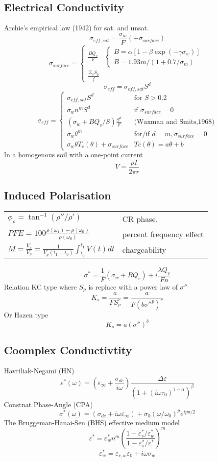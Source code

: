 \documentclass[twocolumn]{article}
\begin{document}
\subsection{Electrical Conductivity}
Archie's empirical law (1942) for sat. and unsat.
\[ \sigma_{eff,sat} = \frac{\sigma_w}{F} (+\sigma_{surface})\]
\[\sigma_{surface}= \left\{
  \begin{array}{lr}
    \frac{BQ_v}{F} & \left\{
    				\begin{array}{l}
    					B=\alpha[1-\beta \exp(-\gamma\sigma_w)]\\
    					B=1.93m/(1+0.7/\sigma_m)
    				\end{array} \right. \\ 
    \frac{\Sigma_s S_p}{f} &
  \end{array}
\right.\]
\[ \sigma_{eff}=\sigma_{eff,sat}S^d\]
\[\sigma_{eff}= \left\{
  \begin{array}{lr}
    \sigma_{eff,sat}S^d &  \text{for } S>0.2\\ 
    \sigma_{w}n^mS^d & \text{if } \sigma_{surface}=0\\
    (\sigma_{w}+BQ_v/S)\frac{S^d}{F} & \text{(Waxman and Smits,1968)}\\
    \sigma_w \theta^m & \text{for/if } d=m,\sigma_{surface}=0\\
    \sigma_w \theta T_c(\theta)+\sigma_{surface} & Tc(\theta)=a\theta+b
  \end{array}
\right.\]
In a homogenous soil with a one-point current
\[V=\frac{\rho I}{2\pi r}\]
\subsection{Induced Polarisation}
\begin{tabular}{@{}ll@{}}
$\phi_\rho=\tan^{-1}\left(\rho''/\rho'\right)$  & CR phase. \\
$PFE=100\frac{\rho\left(\omega_1\right)-\rho\left(\omega_0\right)}{\rho\left(\omega_0\right)}$  & percent frequency effect \\
$M=\frac{V_s}{V_{p}}=\frac{1}{V_{p}\left(t_1-t_0\right)}\int_{t_0}^{t_1}V(t)dt$  & chargeability \\
\end{tabular}
\[\sigma^*=\frac{1}{F}\left(\sigma_w+BQ_v\right)+i\frac{\lambda Q_v}{Fn}\]
Relation KC type where $S_p$ is replace with a power law of $\sigma''$
\[ K_s=\frac{a}{FS_p^c}=\frac{a}{F(b\sigma''^p)^c}\]
Or Hazen type
\[ K_s=a(\sigma'')^b\]
\subsection{Coomplex Conductivtity}
Havriliak-Negami (HN)
\[ \varepsilon^*(\omega) = \left( \varepsilon_\infty + \frac{\sigma_{dc}}{i\omega}\right) \frac{\Delta \varepsilon}{ \left( 1+\left( i \omega \tau_0\right) ^{1-\alpha} \right) ^{\beta} } \]
Constnat Phase-Angle (CPA)
\[ \sigma^*(\omega)=(\sigma_{dc}+i\omega \varepsilon_\infty) + \sigma_0(\omega/\omega_0)^p e^{ip\pi/2} \]
The Bruggeman-Hanai-Sen (BHS) effective medium model
\[ \varepsilon^*=\varepsilon_w^*n^m\left(\frac{1-\varepsilon_s^*/\varepsilon_w^*}{1-\varepsilon_s^*/\varepsilon^*}\right)^m\]
\[\varepsilon_w^*=\varepsilon_{r,w}\varepsilon_0 + i\omega\sigma_w\]
\end{document}

